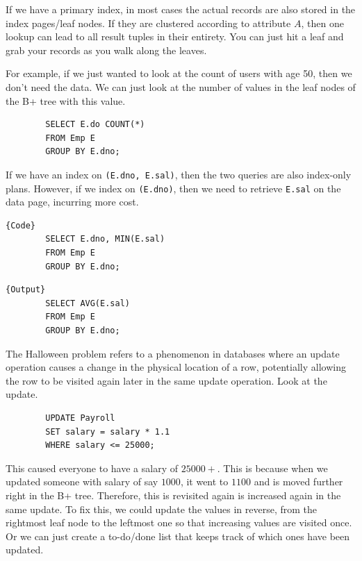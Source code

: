 \documentclass{article}
\begin{document}
    \begin{example}
      If we have a primary index, in most cases the actual records are also stored in the index pages/leaf nodes. If they are clustered according to attribute $A$, then one lookup can lead to all result tuples in their entirety. You can just hit a leaf and grab your records as you walk along the leaves. 
    \end{example}

    \begin{example}
      For example, if we just wanted to look at the count of users with age 50, then we don't need the data. We can just look at the number of values in the leaf nodes of the B+ tree with this value. 
      \begin{lstlisting}
        SELECT E.do COUNT(*) 
        FROM Emp E 
        GROUP BY E.dno;
      \end{lstlisting}

      If we have an index on \texttt{(E.dno, E.sal)}, then the two queries are also index-only plans. However, if we index on \texttt{(E.dno)}, then we need to retrieve \texttt{E.sal} on the data page, incurring more cost. 

      \noindent\begin{minipage}{.5\textwidth}
      \begin{lstlisting}[]{Code}
        SELECT E.dno, MIN(E.sal) 
        FROM Emp E 
        GROUP BY E.dno; 
      \end{lstlisting}
      \end{minipage}
      \hfill
      \begin{minipage}{.49\textwidth}
      \begin{lstlisting}[]{Output}
        SELECT AVG(E.sal) 
        FROM Emp E 
        GROUP BY E.dno;
      \end{lstlisting}
      \end{minipage}
    \end{example}

    \begin{example}
      The Halloween problem refers to a phenomenon in databases where an update operation causes a change in the physical location of a row, potentially allowing the row to be visited again later in the same update operation. Look at the update. 
      \begin{lstlisting}
        UPDATE Payroll 
        SET salary = salary * 1.1 
        WHERE salary <= 25000;
      \end{lstlisting}
      This caused everyone to have a salary of $25000+$. This is because when we updated someone with salary of say $1000$, it went to $1100$ and is moved further right in the B+ tree. Therefore, this is revisited again is increased again in the same update. To fix this, we could update the values in reverse, from the rightmost leaf node to the leftmost one so that increasing values are visited once. Or we can just create a to-do/done list that keeps track of which ones have been updated. 
    \end{example}
\end{document}
